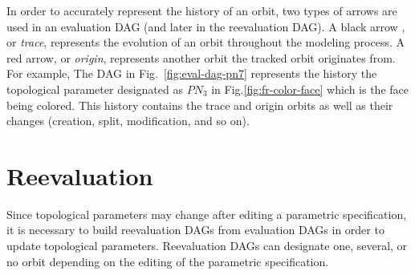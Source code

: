 In order to accurately represent the history of an orbit, two types of arrows
are used in an evaluation DAG (and later in the reevaluation DAG). A black arrow , or \emph{trace}, 
represents the evolution of an orbit throughout the modeling
process. A red arrow, or \emph{origin}, represents another orbit the tracked orbit
originates from.
For example,
The DAG in Fig.~\ref{fig:eval-dag-pn7} represents the history the topological parameter designated as $PN_3$ in Fig.\ref{fig:fr-color-face} which is the face being colored. This history contains the trace and origin orbits as well as their changes (creation, split, modification, and so on).



\section{Reevaluation}

Since topological parameters may change after editing a parametric specification, %
it is necessary to build reevaluation DAGs from evaluation DAGs in
order to update topological parameters. %
Reevaluation DAGs can designate one, several, or no orbit depending
on the editing of the parametric specification.


